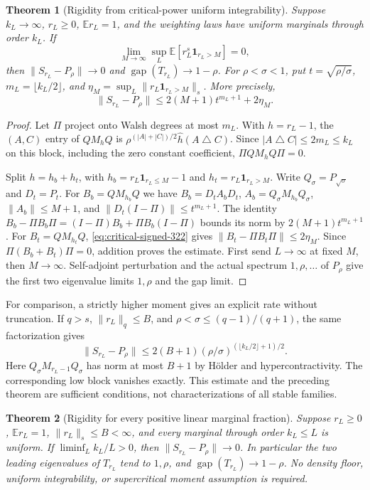 \documentclass[11pt]{article}
\newtheorem{theorem}{Theorem}
\newcommand{\gap}{\operatorname{gap}}
\begin{document}
\begin{theorem}[Rigidity from critical-power uniform integrability]
\label{thm:marginal-ui}
Suppose $k_L\to\infty$, $r_L\geq0$, $\mathbb E r_L=1$, and the
weighting laws have uniform marginals through order $k_L$. If
\[
 \lim_{M\to\infty}\sup_L
 \mathbb E[r_L^s\mathbf1_{r_L>M}]=0,
\]
then $\|S_{r_L}-P_\rho\|\to0$ and $\gap(T_{r_L})\to1-\rho$.
For $\rho<\sigma<1$, put $t=\sqrt{\rho/\sigma}$,
$m_L=\lfloor k_L/2\rfloor$, and
$\eta_M=\sup_L\|r_L\mathbf1_{r_L>M}\|_s$. More precisely,
\[
 \|S_{r_L}-P_\rho\|
 \leq2(M+1)t^{m_L+1}+2\eta_M.
\]
\end{theorem}
\begin{proof}
Let $\Pi$ project onto Walsh degrees at most $m_L$. With $h=r_L-1$,
the $(A,C)$ entry of $QM_hQ$ is
$\rho^{(|A|+|C|)/2}\widehat h(A\mathbin\triangle C)$.
Since $|A\mathbin\triangle C|\leq2m_L\leq k_L$ on this block,
including the zero constant coefficient, $\Pi QM_hQ\Pi=0$.

Split $h=h_b+h_t$, with $h_b=r_L\mathbf1_{r_L\leq M}-1$ and
$h_t=r_L\mathbf1_{r_L>M}$. Write $Q_\sigma=P_{\sqrt\sigma}$ and
$D_t=P_t$. For $B_b=QM_{h_b}Q$ we have
$B_b=D_t A_bD_t$, $A_b=Q_\sigma M_{h_b}Q_\sigma$,
$\|A_b\|\leq M+1$, and $\|D_t(I-\Pi)\|\leq t^{m_L+1}$.
The identity
$B_b-\Pi B_b\Pi=(I-\Pi)B_b+\Pi B_b(I-\Pi)$ bounds its norm by
$2(M+1)t^{m_L+1}$. For $B_t=QM_{h_t}Q$,
\eqref{eq:critical-signed-322} gives $\|B_t-\Pi B_t\Pi\|\leq2\eta_M$.
Since $\Pi(B_b+B_t)\Pi=0$, addition proves the estimate.
First send $L\to\infty$ at fixed $M$, then $M\to\infty$.
Self-adjoint perturbation and the actual spectrum $1,\rho,\ldots$ of
$P_\rho$ give the first two eigenvalue limits $1,\rho$ and the gap limit.
\end{proof}

For comparison, a strictly higher moment gives an explicit rate without
truncation. If $q>s$, $\|r_L\|_q\leq B$, and
$\rho<\sigma\leq(q-1)/(q+1)$, the same factorization gives
\[
 \|S_{r_L}-P_\rho\|\leq2(B+1)
 (\rho/\sigma)^{(\lfloor k_L/2\rfloor+1)/2}.
\]
Here $Q_\sigma M_{r_L-1}Q_\sigma$ has norm at most $B+1$ by
H\"older and hypercontractivity. The corresponding low block vanishes
exactly. This estimate and the preceding theorem are sufficient conditions,
not characterizations of all stable families.

\begin{theorem}[Rigidity for every positive linear marginal fraction]
\label{thm:linear-marginal-rigidity}
Suppose $r_L\geq0$, $\mathbb E r_L=1$, $\|r_L\|_s\leq B<\infty$,
and every marginal through order $k_L\leq L$ is uniform. If
$\liminf_L k_L/L>0$, then $\|S_{r_L}-P_\rho\|\to0$.
In particular the two leading eigenvalues of $T_{r_L}$ tend to $1,\rho$,
and $\gap(T_{r_L})\to1-\rho$. No density floor, uniform integrability,
or supercritical moment assumption is required.
\end{theorem}
\end{document}
